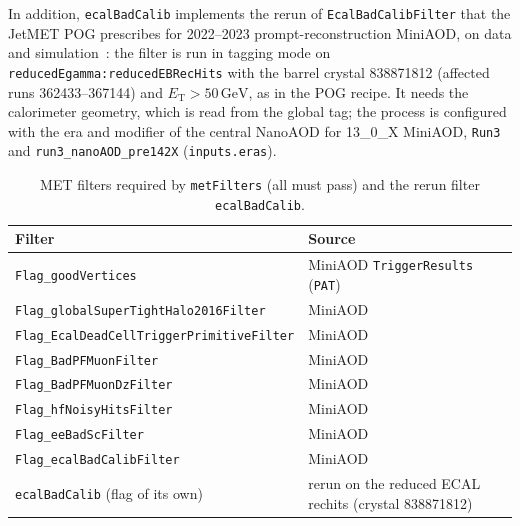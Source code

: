 \documentclass[11pt]{article}
\newcommand{\GeV}{\ensuremath{\,\mathrm{GeV}}}
\newcommand{\code}[1]{\texttt{#1}}
\begin{document}
In addition, \code{ecalBadCalib} implements the rerun of \code{EcalBadCalibFilter} that the JetMET POG prescribes for
2022--2023 prompt-reconstruction MiniAOD, on data and simulation~\cite{JMEmetfilters}: the filter is run in tagging mode
on \code{reducedEgamma:reducedEBRecHits} with the barrel crystal 838871812 (affected runs 362433--367144) and
$E_\mathrm{T} > 50\GeV$, as in the POG recipe. It needs the calorimeter geometry, which is read from the global tag;
the process is configured with the era and modifier of the central NanoAOD for 13\_0\_X MiniAOD, \code{Run3} and
\code{run3\_nanoAOD\_pre142X} (\code{inputs.eras}).

\begin{table}[htbp]
\centering
\caption{MET filters required by \code{metFilters} (all must pass) and the rerun filter \code{ecalBadCalib}.}
\label{tab:metfilters}
\small
\begin{tabular}{lp{7cm}}
\toprule
Filter & Source \\
\midrule
\code{Flag\_goodVertices} & MiniAOD \code{TriggerResults} (\code{PAT}) \\
\code{Flag\_globalSuperTightHalo2016Filter} & MiniAOD \\
\code{Flag\_EcalDeadCellTriggerPrimitiveFilter} & MiniAOD \\
\code{Flag\_BadPFMuonFilter} & MiniAOD \\
\code{Flag\_BadPFMuonDzFilter} & MiniAOD \\
\code{Flag\_hfNoisyHitsFilter} & MiniAOD \\
\code{Flag\_eeBadScFilter} & MiniAOD \\
\code{Flag\_ecalBadCalibFilter} & MiniAOD \\
\code{ecalBadCalib} (flag of its own) & rerun on the reduced ECAL rechits (crystal 838871812) \\
\bottomrule
\end{tabular}
\end{table}
\end{document}
